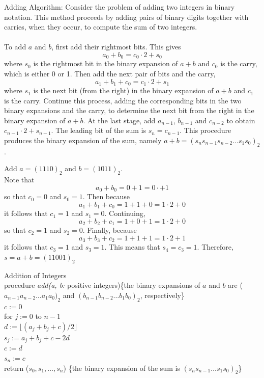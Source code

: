 \documentclass[12pt]{article}
\begin{document}
\begin{alg} Adding Algorithm: Consider the problem of adding two integers in binary notation. This method proceeds by adding pairs of binary digits together with carries, when they occur, to compute the sum of two integers. \\~\\ To add $a$ and $b$, first add their rightmost bits. This gives $$a_0 + b_0 = c_0 \cdot 2 + s_0$$ where $s_0$ is the rightmost bit in the binary expansion of $a + b$ and $c_0$ is the carry, which is either 0 or 1. Then add the next pair of bits and the carry, $$a_1 + b_1 + c_0 = c_1 \cdot 2 + s_1$$ where $s_1$ is the next bit (from the right) in the binary expansion of $a + b$ and $c_1$ is the carry. Continue this process, adding the corresponding bits in the two binary expansions and the carry, to determine the next bit from the right in the binary expansion of $a + b$. At the last stage, add $a_{n - 1}$, $b_{n - 1}$ and $c_{n - 2}$ to obtain $c_{n - 1} \cdot 2 + s_{n - 1}$. The leading bit of the sum is $s_n = c_{n - 1}$. This procedure produces the binary expansion of the sum, namely $a + b = (s_ns_{n - 1}s_{n - 2}\dots s_1s_0)_2$. \end{alg} 
\begin{example} Add $a = (1110)_2$ and $b = (1011)_2$. \\ Note that $$a_0 + b_0 = 0 + 1 = 0 \cdot + 1$$ so that $c_0 = 0$ and $s_0 = 1$. Then because $$a_1 + b_1 + c_0 = 1 + 1 + 0 = 1 \cdot 2 + 0 $$ it follows that $c_1 = 1$ and $s_1 = 0$. Continuing, $$a_2 + b_2 + c_1 = 1 + 0 + 1 = 1 \cdot 2 + 0 $$ so that $c_2 = 1$ and $s_2 = 0$. Finally, because $$a_3 + b_3 + c_2 = 1 + 1 + 1 = 1 \cdot 2 + 1$$ it follows that $c_3 = 1$ and $s_3 = 1$. This means that $s_4 = c_3 = 1$. Therefore, $s = a + b = (11001)_2$ \end{example} 
\begin{alg} Addition of Integers \\ procedure \textit{add(a, b:} positive integers)\{the binary expansions of $a$ and $b$ are ($a_{n - 1}a_{n - 2}\dots a_1a_0)_2$ and $(b_{n - 1}b_{n - 2}\dots b_1b_0)_2$, respectively\} \\ $c := 0$ \\ for $j:= 0$ to $n - 1$ \\ \indent $d:= \lfloor (a_j + b_j + c)/2 \rfloor$ \\ \indent $s_j := a_j + b_j + c - 2d$ \\ \indent $c:= d$ \\ $s_n := c$ \\ return ($s_0, s_1, \dots, s_n$) \{the binary expansion of the sum is $(s_ns_{n - 1}\dots s_1s_0)_2$\} \end{alg} 
\end{document}
